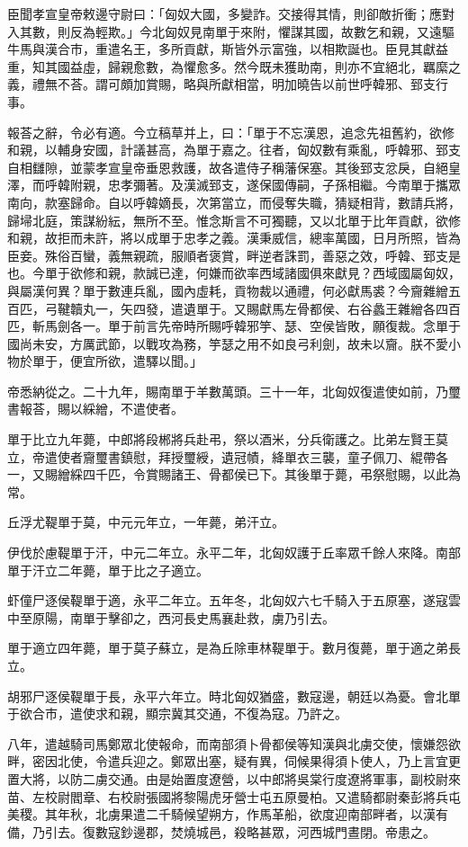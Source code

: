 \begin{pinyinscope}
臣聞孝宣皇帝敕邊守尉曰：「匈奴大國，多變詐。交接得其情，則卻敵折衝；應對入其數，則反為輕欺。」今北匈奴見南單于來附，懼謀其國，故數乞和親，又遠驅牛馬與漢合巿，重遣名王，多所貢獻，斯皆外示富強，以相欺誕也。臣見其獻益重，知其國益虛，歸親愈數，為懼愈多。然今既未獲助南，則亦不宜絕北，羈縻之義，禮無不荅。謂可頗加賞賜，略與所獻相當，明加曉告以前世呼韓邪、郅支行事。

報荅之辭，令必有適。今立稿草并上，曰：「單于不忘漢恩，追念先祖舊約，欲修和親，以輔身安國，計議甚高，為單于嘉之。往者，匈奴數有乘亂，呼韓邪、郅支自相讎隙，並蒙孝宣皇帝垂恩救護，故各遣侍子稱藩保塞。其後郅支忿戾，自絕皇澤，而呼韓附親，忠孝彌著。及漢滅郅支，遂保國傳嗣，子孫相繼。今南單于攜眾南向，款塞歸命。自以呼韓嫡長，次第當立，而侵奪失職，猜疑相背，數請兵將，歸埽北庭，策謀紛紜，無所不至。惟念斯言不可獨聽，又以北單于比年貢獻，欲修和親，故拒而未許，將以成單于忠孝之義。漢秉威信，總率萬國，日月所照，皆為臣妾。殊俗百蠻，義無親疏，服順者褒賞，畔逆者誅罰，善惡之效，呼韓、郅支是也。今單于欲修和親，款誠已達，何嫌而欲率西域諸國俱來獻見？西域國屬匈奴，與屬漢何異？單于數連兵亂，國內虛耗，貢物裁以通禮，何必獻馬裘？今齎雜繒五百匹，弓鞬韥丸一，矢四發，遣遺單于。又賜獻馬左骨都侯、右谷蠡王雜繒各四百匹，斬馬劍各一。單于前言先帝時所賜呼韓邪竽、瑟、空侯皆敗，願復裁。念單于國尚未安，方厲武節，以戰攻為務，竽瑟之用不如良弓利劍，故未以齎。朕不愛小物於單于，便宜所欲，遣驛以聞。」

帝悉納從之。二十九年，賜南單于羊數萬頭。三十一年，北匈奴復遣使如前，乃璽書報荅，賜以綵繒，不遣使者。

單于比立九年薨，中郎將段郴將兵赴弔，祭以酒米，分兵衛護之。比弟左賢王莫立，帝遣使者齎璽書鎮慰，拜授璽綬，遺冠幘，絳單衣三襲，童子佩刀、緄帶各一，又賜繒綵四千匹，令賞賜諸王、骨都侯已下。其後單于薨，弔祭慰賜，以此為常。

丘浮尤鞮單于莫，中元元年立，一年薨，弟汗立。

伊伐於慮鞮單于汗，中元二年立。永平二年，北匈奴護于丘率眾千餘人來降。南部單于汗立二年薨，單于比之子適立。

虾僮尸逐侯鞮單于適，永平二年立。五年冬，北匈奴六七千騎入于五原塞，遂寇雲中至原陽，南單于擊卻之，西河長史馬襄赴救，虜乃引去。

單于適立四年薨，單于莫子蘇立，是為丘除車林鞮單于。數月復薨，單于適之弟長立。

胡邪尸逐侯鞮單于長，永平六年立。時北匈奴猶盛，數寇邊，朝廷以為憂。會北單于欲合巿，遣使求和親，顯宗冀其交通，不復為寇。乃許之。

八年，遣越騎司馬鄭眾北使報命，而南部須卜骨都侯等知漢與北虜交使，懷嫌怨欲畔，密因北使，令遣兵迎之。鄭眾出塞，疑有異，伺候果得須卜使人，乃上言宜更置大將，以防二虜交通。由是始置度遼營，以中郎將吳棠行度遼將軍事，副校尉來苗、左校尉閻章、右校尉張國將黎陽虎牙營士屯五原曼柏。又遣騎都尉秦彭將兵屯美稷。其年秋，北虜果遣二千騎候望朔方，作馬革船，欲度迎南部畔者，以漢有備，乃引去。復數寇鈔邊郡，焚燒城邑，殺略甚眾，河西城門晝閉。帝患之。


\end{pinyinscope}
